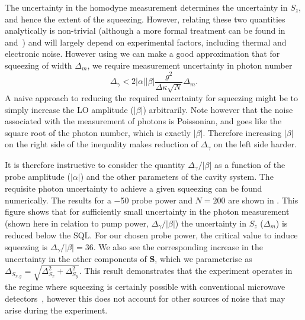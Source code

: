The uncertainty in the homodyne measurement determines the uncertainty in
$S_z$, and hence the extent of the squeezing. However, relating these two
quantities analytically is non-trivial (although a more formal treatment can be
found in  and~\cite{Zhang2019}) and will largely depend on
experimental factors, including thermal and electronic noise. However using
 we can make a good approximation that for
squeezing of width $\Delta_m$, we require measurement uncertainty in photon
number
%
\begin{equation}
  \Delta_\gamma < 2|\alpha||\beta| \frac{g^2}{\Delta\kappa\sqrt{N}}\Delta_m.
\end{equation}
%
A naive approach to reducing the required uncertainty for squeezing might be
to simply increase the LO amplitude ($|\beta|$) arbitrarily. Note however that
the noise associated with the measurement of photons is Poissonian, and goes
like the square root of the photon number, which is exactly $|\beta|$.
Therefore increasing $|\beta|$ on the right side of the inequality makes
reduction of $\Delta_\gamma$ on the left side harder.


It is therefore instructive to consider the quantity $\Delta_\gamma/|\beta|$ as
a function of the probe amplitude ($|\alpha|$) and the other parameters of the
cavity system. The requisite photon uncertainty to achieve a given squeezing
can be found numerically. The results for a \SI{-50}{\dbm} probe power and
$N=200$ are shown in . This figure shows
that for sufficiently small uncertainty in the photon measurement (shown here
in relation to pump power, $\Delta_\gamma/|\beta|$) the uncertainty in $S_z$
($\Delta_m$) is reduced below the SQL. For our chosen probe power, the critical
value to induce squeezing is $\Delta_\gamma/|\beta|=36$.
We also see the corresponding increase in the uncertainty in the other
components of $\mathbf{S}$, which we parameterise as $\Delta_{S_{x,y}} =
\sqrt{\Delta_{S_x}^2 + \Delta_{S_y}^2}$. This result demonstrates that the
experiment operates in the regime where squeezing is certainly possible with
conventional microwave detectors~\cite{Dicke1946, PhysRevD.88.035020}, however
this does not account for other sources of noise that may arise during the
experiment.


